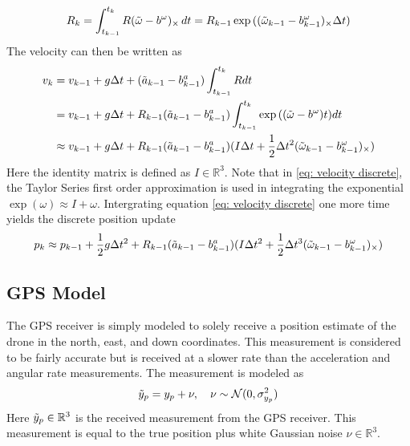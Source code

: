\begin{equation}
    R_k =  \int_{t_{k-1}}^{t_k} R (\Tilde{\omega} - b^{\omega})_{\times} \,dt = R_{k-1} \exp{( (\Tilde{\omega}_{k-1} - b^{\omega}_{k-1})_{\times} \Delta t)}
\label{eq: rotation discrete}
\end{equation}
The velocity can then be written as
\begin{equation}
    \begin{split}
        v_k &= v_{k-1} + g \Delta t + (\Tilde{a}_{k-1} - b^{a}_{k-1}) \int_{t_{k-1}}^{t_k} R dt \\
            &= v_{k-1} + g \Delta t + R_{k-1} (\Tilde{a}_{k-1} - b^{a}_{k-1}) \int_{t_{k-1}}^{t_k} \exp{((\Tilde{\omega} - b^{\omega})t)} dt \\
            &\approx v_{k-1} + g \Delta t + R_{k-1}(\Tilde{a}_{k-1} - b^{a}_{k-1}) (I \Delta t + \frac{1}{2} \Delta t^2 (\Tilde{\omega}_{k-1} - b^{\omega}_{k-1})_{\times})
    \end{split}
\label{eq: velocity discrete}
\end{equation}
Here the identity matrix is defined as $I \in \mathbb{R}^3$. Note that in \eqref{eq: velocity discrete}, the Taylor Series first order approximation is used in integrating the exponential $\exp{(\omega)} \approx I + \omega$. Intergrating equation \eqref{eq: velocity discrete} one more time yields the discrete position update
\begin{equation}
        p_k \approx p_{k-1} + \frac{1}{2} g \Delta t^2 + R_{k-1}(\Tilde{a}_{k-1} - b^{a}_{k-1}) (I \Delta t^2 + \frac{1}{2} \Delta t^3 (\Tilde{\omega}_{k-1} - b^{\omega}_{k-1})_{\times})
\label{eq: position discrete}
\end{equation}


\subsection{GPS Model}

The GPS receiver is simply modeled to solely receive a position estimate of the drone in the north, east, and down coordinates. This measurement is considered to be fairly accurate but is received at a slower rate than the acceleration and angular rate measurements. The measurement is modeled as 
\begin{equation}
       \Tilde{y}_p = y_p + \nu, \quad \nu \sim \mathcal{N}(0, \sigma_{y_p}^2)
\label{eq: position gps}
\end{equation}
Here $\Tilde{y}_p \in \mathbb{R}^3$ is the received measurement from the GPS receiver. This measurement is equal to the true position plus white Gaussian noise $\nu \in \mathbb{R}^3$.




